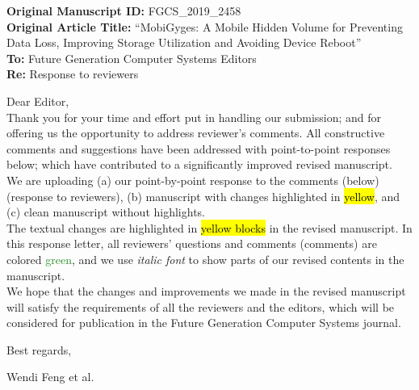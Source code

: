 
\noindent\textbf{Original Manuscript ID:} FGCS\_2019\_2458\\
\noindent\textbf{Original Article Title:} ``MobiGyges: A Mobile Hidden Volume for Preventing Data Loss, Improving Storage Utilization and Avoiding Device Reboot''\\

\noindent\textbf{To:} Future Generation Computer Systems Editors\\
\noindent\textbf{Re:} Response to reviewers\\

\vspace{10em}

\noindent Dear Editor,\\

Thank you for your time and effort put in handling our submission; and for offering us the opportunity to address reviewer's comments. All constructive comments and suggestions have been addressed with point-to-point responses below; which have contributed to a significantly improved revised manuscript. \\


We are uploading (a) our point-by-point response to the comments (below) (response to reviewers), (b) manuscript with changes highlighted in \hl{yellow}, and (c) clean manuscript without highlights.\\



The textual changes are highlighted in \hl{yellow blocks} in the revised manuscript. In this response letter, all reviewers' questions and comments (comments) are colored \textcolor{ForestGreen}{green}, and we use \textit{italic font} to show parts of our revised contents in the manuscript.\\

We hope that the changes and improvements we made in the revised manuscript will satisfy the requirements of all the reviewers and the editors, which will be considered for publication in the Future Generation Computer Systems journal.

\vspace{5em}

\noindent Best regards,

\noindent Wendi Feng et al.

